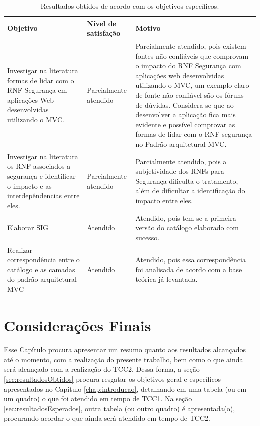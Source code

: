 \begin{table}[h!]
	\centering
	\caption{Resultados obtidos de acordo com os objetivos específicos.}
	\label{resultadosObtidos}
	\tiny
	\begin{tabular}{@{}p{6cm}p{3cm}p{6cm}@{}}
		\toprule
		\textbf{Objetivo} & \textbf{Nível de satisfação} & \textbf{Motivo} \\ \midrule
		Investigar na literatura formas de lidar com o RNF Segurança  em aplicações Web desenvolvidas utilizando o MVC. & Parcialmente atendido & Parcialmente atendido, pois existem fontes não confiáveis que comprovam o impacto do RNF Segurança com aplicações web desenvolvidas utilizando o MVC, um exemplo claro de fonte não confiável são os fóruns de dúvidas. Considera-se que ao desenvolver a aplicação fica mais evidente e possível comprovar as formas de lidar com o RNF segurança no Padrão arquitetural MVC. \\
		\rowcolor[HTML]{C0C0C0} 
		Investigar na literatura os RNF associados a segurança e identificar o impacto e as interdepêndencias entre eles. & Parcialmente atendido & Parcialmente atendido, pois a subjetividade dos RNFs para Segurança dificulta o tratamento, além de dificultar a identificação do impacto entre eles. \\
		Elaborar SIG & Atendido & Atendido, pois tem-se a primeira versão do catálogo elaborado com sucesso. \\
		\rowcolor[HTML]{C0C0C0} 
		Realizar correspondência entre o catálogo e as camadas do padrão arquitetural MVC & Atendido & Atendido, pois essa correspondência foi analisada de acordo com a base teórica já levantada. \\ \bottomrule
	\end{tabular}
\end{table}

\chapter{Considerações Finais}
\label{chap:consideracoesFinais}

Esse Capítulo procura apresentar um resumo quanto aos resultados alcançados até o momento, com a realização do presente trabalho, bem como o que ainda será alcançado com a realização do TCC2. Dessa forma, a seção \ref{sec:resultadosObtidos} procura resgatar os objetivos geral e específicos apresentados no Capítulo \ref{chap:introducao}, detalhando em uma tabela (ou em um quadro) o que foi atendido em tempo de TCC1. Na seção \ref{sec:resultadosEsperados}, outra tabela (ou outro quadro) é apresentada(o), procurando acordar o que ainda será atendido em tempo de TCC2.


